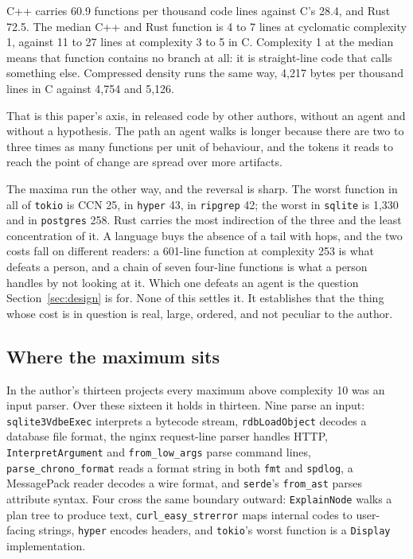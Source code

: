 \documentclass[11pt,a4paper]{article}
\begin{document}
C++ carries 60.9 functions per thousand code lines against C's 28.4, and Rust 72.5. The median C++ and Rust function is 4 to 7 lines at cyclomatic complexity 1, against 11 to 27 lines at complexity 3 to 5 in C. Complexity 1 at the median means that function contains no branch at all: it is straight-line code that calls something else. Compressed density runs the same way, 4,217 bytes per thousand lines in C against 4,754 and 5,126.

That is this paper's axis, in released code by other authors, without an agent and without a hypothesis. The path an agent walks is longer because there are two to three times as many functions per unit of behaviour, and the tokens it reads to reach the point of change are spread over more artifacts.

The maxima run the other way, and the reversal is sharp. The worst function in all of \texttt{tokio} is CCN 25, in \texttt{hyper} 43, in \texttt{ripgrep} 42; the worst in \texttt{sqlite} is 1,330 and in \texttt{postgres} 258. Rust carries the most indirection of the three and the least concentration of it. A language buys the absence of a tail with hops, and the two costs fall on different readers: a 601-line function at complexity 253 is what defeats a person, and a chain of seven four-line functions is what a person handles by not looking at it. Which one defeats an agent is the question Section~\ref{sec:design} is for. None of this settles it. It establishes that the thing whose cost is in question is real, large, ordered, and not peculiar to the author.

\subsection{Where the maximum sits}

In the author's thirteen projects every maximum above complexity 10 was an input parser. Over these sixteen it holds in thirteen. Nine parse an input: \texttt{sqlite3VdbeExec} interprets a bytecode stream, \texttt{rdbLoadObject} decodes a database file format, the nginx request-line parser handles HTTP, \texttt{InterpretArgument} and \texttt{from\_low\_args} parse command lines, \texttt{parse\_chrono\_format} reads a format string in both \texttt{fmt} and \texttt{spdlog}, a MessagePack reader decodes a wire format, and \texttt{serde}'s \texttt{from\_ast} parses attribute syntax. Four cross the same boundary outward: \texttt{ExplainNode} walks a plan tree to produce text, \texttt{curl\_easy\_strerror} maps internal codes to user-facing strings, \texttt{hyper} encodes headers, and \texttt{tokio}'s worst function is a \texttt{Display} implementation.
\end{document}
